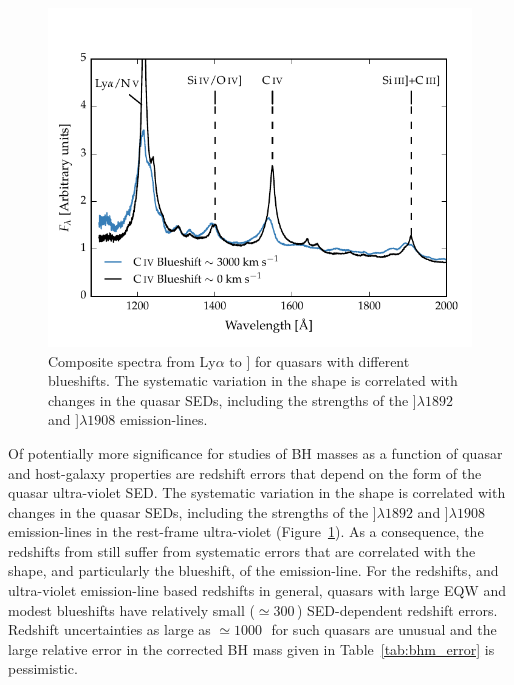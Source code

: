 \begin{figure}[h!]
\centering
  \includegraphics[width=\columnwidth]{figures/chapter03/blueshift_composite.pdf}
\caption[{Composite spectra from Ly$\alpha$ to ] for quasars with different  blueshifts.}]{Composite spectra from Ly$\alpha$ to ] for quasars with different  blueshifts. The systematic variation in the  shape is correlated with changes in the quasar SEDs, including the strengths of the ]$\lambda$$1892$ and ]$\lambda$$1908$ emission-lines.}
  \label{fig:blueshift_composite}
\end{figure}

Of potentially more significance for studies of BH masses as a function of quasar and host-galaxy properties are redshift errors that depend on the form of the quasar ultra-violet SED.
The systematic variation in the  shape is correlated with changes in the quasar SEDs, including the strengths of the ]$\lambda$$1892$ and ]$\lambda$$1908$ emission-lines in the rest-frame ultra-violet (Figure~\ref{fig:blueshift_composite}). 
As a consequence, the redshifts from \citet{hewett10} still suffer from systematic errors that are correlated with the shape, and particularly the blueshift, of the  emission-line.
For the \citet{hewett10} redshifts, and ultra-violet emission-line based redshifts in general, quasars with large  EQW and modest blueshifts have relatively small ($\simeq300$\,\kms) SED-dependent redshift errors.
Redshift uncertainties as large as $\simeq1000$\,\kms\, for such quasars are unusual and the large relative error in the corrected  BH mass given in Table~\ref{tab:bhm_error} is pessimistic. 


